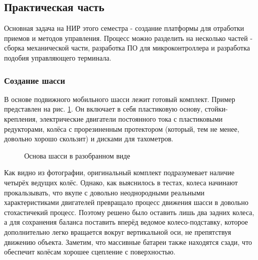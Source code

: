 \documentclass[14pt,a4paper,russian]{scrartcl}
\begin{document}
\subsection{Практическая часть}
Основная задача на НИР этого семестра - создание платформы для отработки
приемов и методов управления. Процесс можно разделить на
несколько частей - сборка механической части, разработка ПО для микроконтроллера и 
разработка подобия управляющего терминала.

\subsubsection{Создание шасси}
В основе подвижного мобильного шасси лежит готовый комплект. Пример
представлен на рис. \ref{fig:shassis_dissassembled}. Он включает в себя пластиковую основу,
стойки-крепления, электрические двигатели постоянного тока с пластиковыми редукторами,
колёса с прорезиненным протектором (который, тем не менее, довольно хорошо скользит)
и дисками для тахометров.
\begin{figure}[h]
    \caption{Основа шасси в разобранном виде}
    \label{fig:shassis_dissassembled}
\end{figure}

Как видно из фотографии, оригинальный комплект подразумевает наличие четырёх
ведущих колёс. Однако, как выяснилось в тестах, колеса начинают прокальзывать,
что вкупе с довольно неоднородными реальными характеристиками двигателей
превращало процесс движения шасси в довольно стохастичекий процесс. Поэтому
решено было оставить лишь два задних колеса, а для сохранения баланса
поставить вперёд ведомое колесо-подставку, которое дополнительно
легко вращается вокруг вертикальной оси, не препятствуя движению объекта. Заметим,
что массивные батареи также находятся сзади, что обеспечит колёсам хорошее
сцепление с поверхностью.
\end{document}
